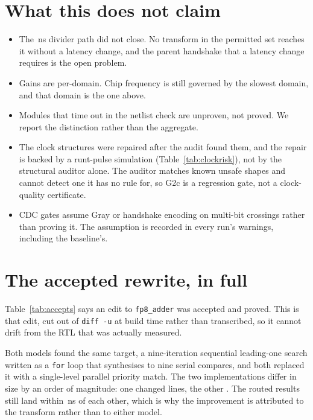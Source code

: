 \documentclass[11pt,a4paper]{article}
\begin{document}
\section{What this does not claim}

\begin{itemize}
  \item The \baselinewns\,ns divider path did not close. No transform in the
        permitted set reaches it without a latency change, and the parent
        handshake that a latency change requires is the open problem.
  \item Gains are per-domain. Chip frequency is still governed by the slowest
        domain, and that domain is the one above.
  \item Modules that time out in the netlist check are unproven, not proved.
        We report the distinction rather than the aggregate.
  \item The clock structures were repaired after the audit found them, and
        the repair is backed by a runt-pulse simulation
        (Table~\ref{tab:clockrisk}), not by the structural auditor alone. The
        auditor matches known unsafe shapes and cannot detect one it has no
        rule for, so G2c is a regression gate, not a clock-quality
        certificate.
  \item CDC gates assume Gray or handshake encoding on multi-bit crossings
        rather than proving it. The assumption is recorded in every run's
        warnings, including the baseline's.
\end{itemize}

\appendix
\section{The accepted rewrite, in full}

Table~\ref{tab:accepts} says an edit to \texttt{fp8\_adder} was accepted and
proved. This is that edit, cut out of \texttt{diff -u} at build time rather
than transcribed, so it cannot drift from the RTL that was actually measured.

Both models found the same target, a nine-iteration sequential leading-one
search written as a \texttt{for} loop that synthesises to nine serial compares,
and both replaced it with a single-level parallel priority match. The two
implementations differ in size by an order of magnitude: one changed
\difflinessonnet{} lines, the other \difflinesnemotronultra{}. The routed
results still land within \bestagreement\,ns of each other, which is why the
improvement is attributed to the transform rather than to either model.
\end{document}

